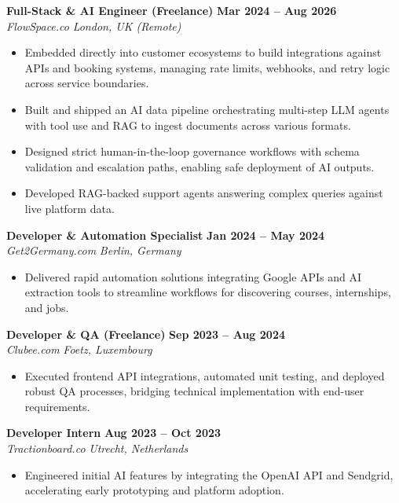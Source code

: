 \documentclass[11pt,a4paper]{article}
\begin{document}
\noindent \textbf{Full-Stack \& AI Engineer (Freelance)} \hfill \textbf{Mar 2024 -- Aug 2026} \\
\textit{FlowSpace.co} \hfill \textit{London, UK (Remote)}
\begin{itemize}[leftmargin=*, noitemsep]
    \item Embedded directly into customer ecosystems to build integrations against APIs and booking systems, managing rate limits, webhooks, and retry logic across service boundaries.
    \item Built and shipped an AI data pipeline orchestrating multi-step LLM agents with tool use and RAG to ingest documents across various formats.
    \item Designed strict human-in-the-loop governance workflows with schema validation and escalation paths, enabling safe deployment of AI outputs.
    \item Developed RAG-backed support agents answering complex queries against live platform data.
\end{itemize}
\vspace{6pt}

\noindent \textbf{Developer \& Automation Specialist} \hfill \textbf{Jan 2024 -- May 2024} \\
\textit{Get2Germany.com} \hfill \textit{Berlin, Germany}
\begin{itemize}[leftmargin=*, noitemsep]
    \item Delivered rapid automation solutions integrating Google APIs and AI extraction tools to streamline workflows for discovering courses, internships, and jobs.
\end{itemize}
\vspace{6pt}

\noindent \textbf{Developer \& QA (Freelance)} \hfill \textbf{Sep 2023 -- Aug 2024} \\
\textit{Clubee.com} \hfill \textit{Foetz, Luxembourg}
\begin{itemize}[leftmargin=*, noitemsep]
    \item Executed frontend API integrations, automated unit testing, and deployed robust QA processes, bridging technical implementation with end-user requirements.
\end{itemize}
\vspace{6pt}

\noindent \textbf{Developer Intern} \hfill \textbf{Aug 2023 -- Oct 2023} \\
\textit{Tractionboard.co} \hfill \textit{Utrecht, Netherlands}
\begin{itemize}[leftmargin=*, noitemsep]
    \item Engineered initial AI features by integrating the OpenAI API and Sendgrid, accelerating early prototyping and platform adoption.
\end{itemize}
\end{document}
